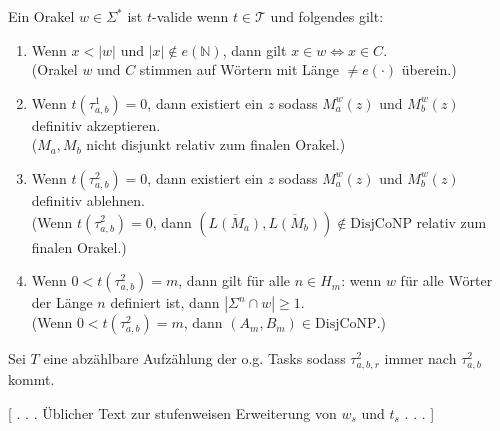 \documentclass[nofonts]{uebung}
\theoremstyle{definition}
\def\DisjCoNP{\ensuremath{\mathrm{DisjCoNP}}}
\begin{document}
Ein Orakel $w\in\Sigma^*$ ist $t$-valide wenn $t\in\mathcal T$ und folgendes gilt:
\begin{enumerate}[label={V\arabic*}]
    \item Wenn $x<|w|$ und $|x|\not\in e(\mathbb N)$, dann gilt $x\in w\iff x\in C$.\\
        (Orakel $w$ und $C$ stimmen auf Wörtern mit Länge $\neq e(\cdot)$ überein.)
    \item Wenn $t(\tau^1_{a,b})=0$, dann existiert ein $z$ sodass $M_a^w(z)$ und $M_b^w(z)$ definitiv akzeptieren.\\
        ($M_a, M_b$ nicht disjunkt relativ zum finalen Orakel.)
    \item Wenn $t(\tau^2_{a,b})=0$, dann existiert ein $z$ sodass $M_a^w(z)$ und $M_b^w(z)$ definitiv ablehnen.\\
        (Wenn $t(\tau^2_{a,b})=0$, dann $(\overline{L(M_a)}, \overline{ L(M_b)})\not\in \DisjCoNP$ relativ zum finalen Orakel.)
    \item Wenn $0<t(\tau^2_{a,b})=m$, dann gilt für alle $n\in H_m$: wenn $w$ für alle Wörter der Länge $n$ definiert ist, dann $|\Sigma^n\cap w|\geq 1$.\\
        (Wenn $0<t(\tau^2_{a,b})=m$, dann $(A_m,B_m)\in\DisjCoNP$.)
\end{enumerate}

Sei $T$ eine abzählbare Aufzählung der o.g. Tasks sodass $\tau^2_{a,b,r}$ immer nach $\tau^2_{a,b}$ kommt.

[ . . . Üblicher Text zur stufenweisen Erweiterung von $w_s$ und $t_s$ . . . ]
\end{document}
